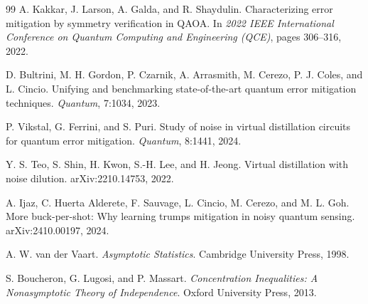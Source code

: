 \documentclass[11pt]{article}
\newcommand{\1}{\mathbf{1}}
\begin{document}
\begin{thebibliography}{99}
A. Kakkar, J. Larson, A. Galda, and R. Shaydulin.
\newblock Characterizing error mitigation by symmetry verification in QAOA.
\newblock In \emph{2022 IEEE International Conference on Quantum Computing and Engineering (QCE)}, pages 306--316, 2022.

D. Bultrini, M. H. Gordon, P. Czarnik, A. Arrasmith, M. Cerezo, P. J. Coles, and L. Cincio.
\newblock Unifying and benchmarking state-of-the-art quantum error mitigation techniques.
\newblock \emph{Quantum}, 7:1034, 2023.

P. Vikstal, G. Ferrini, and S. Puri.
\newblock Study of noise in virtual distillation circuits for quantum error mitigation.
\newblock \emph{Quantum}, 8:1441, 2024.

Y. S. Teo, S. Shin, H. Kwon, S.-H. Lee, and H. Jeong.
\newblock Virtual distillation with noise dilution.
\newblock arXiv:2210.14753, 2022.

A. Ijaz, C. Huerta Alderete, F. Sauvage, L. Cincio, M. Cerezo, and M. L. Goh.
\newblock More buck-per-shot: Why learning trumps mitigation in noisy quantum sensing.
\newblock arXiv:2410.00197, 2024.

A. W. van der Vaart.
\newblock \emph{Asymptotic Statistics}.
\newblock Cambridge University Press, 1998.

S. Boucheron, G. Lugosi, and P. Massart.
\newblock \emph{Concentration Inequalities: A Nonasymptotic Theory of Independence}.
\newblock Oxford University Press, 2013.

\end{thebibliography}
\end{document}
